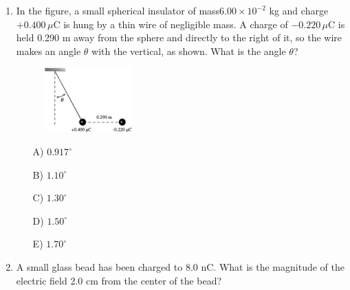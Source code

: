 \begin{enumerate}
    \begin{multicols}{5}
    \begin{itemize}
        \item[A)] $1.9\times10^{-4}$ N
        \item[B)] $1.2\times10^{-4}$ N
        \item[C)] $1.6\times10^{-4}$ N
        \item[D)] $2.3\times10^{-4}$ N
    \end{itemize}
    \end{multicols}


    \item In the figure, a small spherical insulator of mass$ 6.00 \times 10^{-2}$ kg and charge $+0.400 \,\mu$C is hung by a thin wire of negligible mass. A charge of $-0.220\,\mu$C is held 0.290 m away from the sphere and directly to the right of it, so the wire makes an angle $\theta$ with the vertical, as shown. What is the angle $\theta$?

    \begin{figure}[H]
        \centering
        \includegraphics[width=0.32\textwidth]{figures-workshop01/problem-8.png}
    \end{figure}

    \begin{multicols}{5}
    \begin{itemize}
        \item[A)] $0.917^\circ$
        \item[B)] $1.10^\circ$
        \item[C)] $1.30^\circ$
        \item[D)] $1.50^\circ$
        \item[E)] $1.70^\circ$
    \end{itemize}
    \end{multicols}


    \item A small glass bead has been charged to 8.0 nC. What is the magnitude of the electric field 2.0 cm from the center of the bead?


\end{enumerate}

